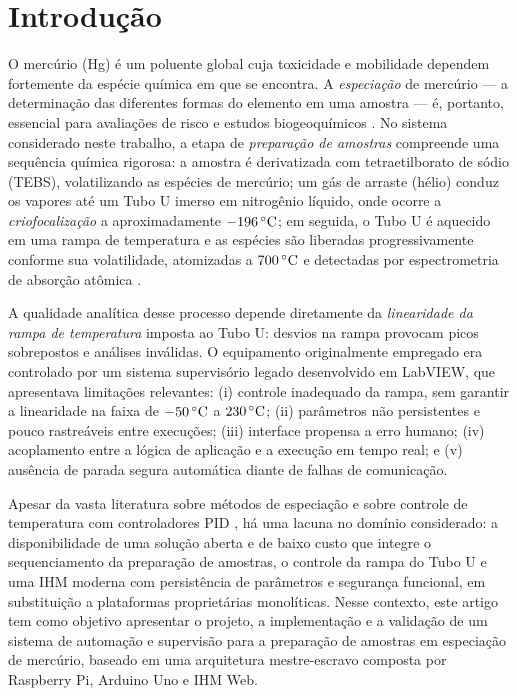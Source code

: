 \section{Introdu\c{c}\~ao}
\label{sec:intro}

O merc\'urio (Hg) \'e um poluente global cuja toxicidade e mobilidade dependem
fortemente da esp\'ecie qu\'imica em que se encontra. A \emph{especia\c{c}\~ao}
de merc\'urio --- a determina\c{c}\~ao das diferentes formas do elemento em uma
amostra --- \'e, portanto, essencial para avalia\c{c}\~oes de risco e estudos
biogeoqu\'imicos \cite{leermakers2005}. No sistema considerado neste trabalho,
a etapa de \emph{prepara\c{c}\~ao de amostras} compreende uma sequ\^encia
qu\'imica rigorosa: a amostra \'e derivatizada com tetraetilborato de s\'odio
(TEBS), volatilizando as esp\'ecies de merc\'urio; um g\'as de arraste (h\'elio)
conduz os vapores at\'e um Tubo U imerso em nitrog\^enio l\'iquido, onde ocorre a
\emph{criofocaliza\c{c}\~ao} a aproximadamente $-196\,\celsius$; em seguida, o
Tubo U \'e aquecido em uma rampa de temperatura e as esp\'ecies s\~ao liberadas
progressivamente conforme sua volatilidade, atomizadas a $700\,\celsius$ e
detectadas por espectrometria de absor\c{c}\~ao at\^omica
\cite{bloom1989,liang1994,lumex}.

A qualidade anal\'itica desse processo depende diretamente da
\emph{linearidade da rampa de temperatura} imposta ao Tubo U: desvios na rampa
provocam picos sobrepostos e an\'alises inv\'alidas. O equipamento originalmente
empregado era controlado por um sistema supervis\'orio legado desenvolvido em
LabVIEW, que apresentava limita\c{c}\~oes relevantes: (i) controle inadequado da
rampa, sem garantir a linearidade na faixa de $-50\,\celsius$ a
$230\,\celsius$; (ii) par\^ametros n\~ao persistentes e pouco rastre\'aveis entre
execu\c{c}\~oes; (iii) interface propensa a erro humano; (iv) acoplamento entre a
l\'ogica de aplica\c{c}\~ao e a execu\c{c}\~ao em tempo real; e (v) aus\^encia de
parada segura autom\'atica diante de falhas de comunica\c{c}\~ao.

Apesar da vasta literatura sobre m\'etodos de especia\c{c}\~ao
\cite{bloom1989,liang1994,leermakers2005} e sobre controle de temperatura com
controladores PID \cite{astrom2006,ogata2010}, h\'a uma lacuna no dom\'inio
considerado: a disponibilidade de uma solu\c{c}\~ao aberta e de baixo custo que
integre o sequenciamento da prepara\c{c}\~ao de amostras, o controle da rampa do
Tubo U e uma IHM moderna com persist\^encia de par\^ametros e seguran\c{c}a
funcional, em substitui\c{c}\~ao a plataformas propriet\'arias monol\'iticas.
Nesse contexto, este artigo tem como objetivo apresentar o projeto, a
implementa\c{c}\~ao e a valida\c{c}\~ao de um sistema de automa\c{c}\~ao e
supervis\~ao para a prepara\c{c}\~ao de amostras em especia\c{c}\~ao de
merc\'urio, baseado em uma arquitetura mestre-escravo composta por Raspberry Pi,
Arduino Uno e IHM Web.

